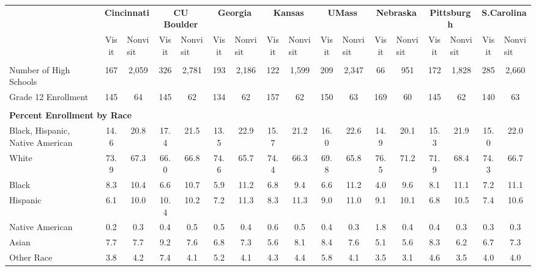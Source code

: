 \begin{tabular*}{\linewidth}{@{\extracolsep{\fill} } lcccccccccccccccc}%
&\multicolumn{2}{c}{\bfseries Cincinnati}&\multicolumn{2}{c}{\bfseries CU Boulder}&\multicolumn{2}{c}{\bfseries Georgia}&\multicolumn{2}{c}{\bfseries Kansas}&\multicolumn{2}{c}{\bfseries UMass}&\multicolumn{2}{c}{\bfseries Nebraska}&\multicolumn{2}{c}{\bfseries Pittsburgh}&\multicolumn{2}{c}{\bfseries S.Carolina}\\%
&Visit&\multicolumn{1}{l}{Nonvisit}&Visit&\multicolumn{1}{l}{Nonvisit}&Visit&\multicolumn{1}{l}{Nonvisit}&Visit&\multicolumn{1}{l}{Nonvisit}&Visit&\multicolumn{1}{l}{Nonvisit}&Visit&\multicolumn{1}{l}{Nonvisit}&Visit&\multicolumn{1}{l}{Nonvisit}&Visit&\multicolumn{1}{l}{Nonvisit}\\%
\hline%
&&&&&&&&&&&&&&&&\\%
\hspace{0cm}Number of High Schools&167&2,059&326&2,781&193&2,186&122&1,599&209&2,347&66&951&172&1,828&285&2,660\\%
\hspace{0cm}Grade 12 Enrollment&145&64&145&62&134&62&157&62&150&63&169&60&145&62&140&63\\%
&&&&&&&&&&&&&&&&\\%
\multicolumn{17}{l}{\bfseries Percent Enrollment by Race}\\%
\hspace{0.2cm}Black, Hispanic, Native American&14.6&20.8&17.4&21.5&13.5&22.9&15.7&21.2&16.0&22.6&14.9&20.1&15.3&21.9&15.0&22.0\\%
\hspace{0.2cm}White&73.9&67.3&66.0&66.8&74.6&65.7&74.4&66.3&69.8&65.8&76.5&71.2&71.9&68.4&74.3&66.7\\%
\hspace{0.2cm}Black&8.3&10.4&6.6&10.7&5.9&11.2&6.8&9.4&6.6&11.2&4.0&9.6&8.1&11.1&7.2&11.1\\%
\hspace{0.2cm}Hispanic&6.1&10.0&10.4&10.2&7.2&11.3&8.3&11.3&9.0&11.0&9.1&10.1&6.8&10.5&7.4&10.6\\%
\hspace{0.2cm}Native American&0.2&0.3&0.4&0.5&0.5&0.4&0.6&0.5&0.4&0.3&1.8&0.4&0.4&0.3&0.3&0.3\\%
\hspace{0.2cm}Asian&7.7&7.7&9.2&7.6&6.8&7.3&5.6&8.1&8.4&7.6&5.1&5.6&8.3&6.2&6.7&7.3\\%
\hspace{0.2cm}Other Race&3.8&4.2&7.4&4.1&5.2&4.1&4.3&4.4&5.8&4.1&3.5&3.1&4.6&3.5&4.0&4.0\\%

\end{tabular*}
